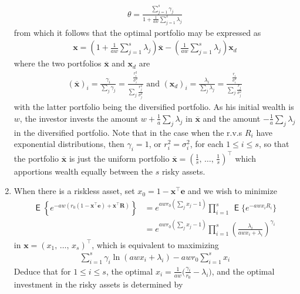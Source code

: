 \documentclass[10pt,handout]{beamer}
\newcommand{\ds}{\displaystyle}
\DeclareMathOperator\expc{\mathsf{E}}
\theoremstyle{definition}
\begin{document}
\begin{frame}[allowframebreaks]
\begin{enumerate}
\begin{align*}
      \theta = \frac{\sum_{j=1}^s \gamma_j}{1 + \frac{1}{aw}\sum_{j=1}^s \lambda_j}
    \end{align*}
    from which it follows that the optimal portfolio may be expressed as
    \begin{align*}
      \mathbf{x} = \left(1 + \frac{1}{aw}\sum_{j=1}^s \lambda_j\right)\overline{\mathbf{x}} - \left(\frac{1}{aw}\sum_{j=1}^s \lambda_j\right)\mathbf{x}_d
    \end{align*}
    where the two portfolios $\overline{\mathbf{x}}$ and $\mathbf{x}_d$ are
    \begin{align*}
      (\overline{\mathbf{x}})_i = \frac{\gamma_i}{\sum_j\gamma_j} = \frac{\frac{r_i^2}{\sigma_i^2}}{\sum_j \frac{r_j^2}{\sigma_j^2}} \text{ and } (\mathbf{x}_d)_i = \frac{\lambda_i}{\sum_j\lambda_j} = \frac{\frac{r_i}{\sigma_i^2}}{\sum_j\frac{r_j}{\sigma_j^2}}
    \end{align*}
    with the latter portfolio being the diversified portfolio. As his initial wealth is $w$, the investor invests the amount $\ds w + \frac{1}{a}\sum_j\lambda_j$ in $\overline{\mathbf{x}}$ and the amount $\ds-\frac{1}{a}\sum_j\lambda_j$ in the diversified portfolio. Note that in the case when the r.v.s $R_i$ have exponential distributions, then $\gamma_i = 1$, or $r_i^2 = \sigma_i^2$, for each $1 \leqslant i \leqslant s$, so that the portfolio $\overline{\mathbf{x}}$ is just the uniform portfolio $\ds\overline{\mathbf{x}} = \left(\frac{1}{s},\,\ldots,\,\frac{1}{s}\right)^\top$ which apportions wealth equally between the $s$ risky assets.
    \item When there is a riskless asset, set $x_0 = 1 - \mathbf{x}^\top\mathbf{e}$ and we wish to minimize
      \begin{align*}
        \expc\left\{e^{-aw(r_0(1-\mathbf{x}^\top\mathbf{e})+\mathbf{x}^\top\mathbf{R})}\right\} &= e^{awr_0(\sum_j x_j-1)} \prod_{i=1}^s\,\expc\big\{e^{-awx_i R_i}\big\} \\ &= e^{awr_0(\sum_j x_j-1)} \prod_{i=1}^s \left(\frac{\lambda_i}{awx_i + \lambda_i}\right)^{\gamma_i}
      \end{align*}
      in $\mathbf{x} = \left(x_1,\,\ldots,\,x_s\right)^\top$, which is equivalent to maximizing
      \begin{align*}
        \sum_{i=1}^s \gamma_i\ln(awx_i + \lambda_i) - awr_0\sum_{i=1}^s x_i
      \end{align*}
      Deduce that for $1 \leqslant i \leqslant s$, the optimal $\ds x_i = \frac{1}{aw}\Big(\frac{\gamma_i}{r_0} - \lambda_i\Big)$, and the optimal investment in the risky assets is determined by

\end{enumerate}
\end{frame}
\end{document}
